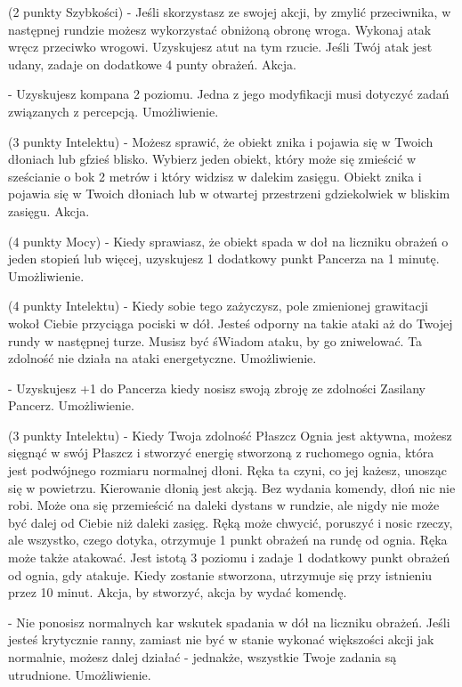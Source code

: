 { (2 punkty Szybkości) - Jeśli skorzystasz ze swojej akcji, by zmylić przeciwnika, w następnej rundzie możesz wykorzystać obniżoną obronę wroga. Wykonaj atak wręcz przeciwko wrogowi. Uzyskujesz atut na tym rzucie. Jeśli Twój atak jest udany, zadaje on dodatkowe 4 punty obrażeń. Akcja.

 - Uzyskujesz kompana 2 poziomu. Jedna z jego modyfikacji musi dotyczyć zadań związanych z percepcją. Umożliwienie.

 (3 punkty Intelektu) - Możesz sprawić, że obiekt znika i pojawia się w Twoich dłoniach lub gfzieś blisko. Wybierz jeden obiekt, który może się zmieścić w sześcianie o bok 2 metrów i który widzisz w dalekim zasięgu. Obiekt znika i pojawia się w Twoich dłoniach lub w otwartej przestrzeni gdziekolwiek w bliskim zasięgu. Akcja.

 (4 punkty Mocy) - Kiedy sprawiasz, że obiekt spada w doł na liczniku obrażeń o jeden stopień lub więcej, uzyskujesz 1 dodatkowy punkt Pancerza na 1 minutę. Umożliwienie.

 (4 punkty Intelektu) - Kiedy sobie tego zażyczysz, pole zmienionej grawitacji wokoł Ciebie przyciąga pociski w dół. Jesteś odporny na takie ataki aż do Twojej rundy w następnej turze. Musisz być śWiadom ataku, by go zniwelować. Ta zdolność nie działa na ataki energetyczne. Umożliwienie.

 - Uzyskujesz +1 do Pancerza kiedy nosisz swoją zbroję ze zdolności Zasilany Pancerz. Umożliwienie.

 (3 punkty Intelektu) - Kiedy Twoja zdolność Płaszcz Ognia jest aktywna, możesz sięgnąć w swój Płaszcz i stworzyć energię stworzoną z ruchomego ognia, która jest podwójnego rozmiaru normalnej dłoni. Ręka ta czyni, co jej każesz, unosząc się w powietrzu. Kierowanie dłonią jest akcją. Bez wydania komendy, dłoń nic nie robi. Może ona się przemieścić na daleki dystans w rundzie, ale nigdy nie może być dalej od Ciebie niż daleki zasięg. Ręką może chwycić, poruszyć i nosic rzeczy, ale wszystko, czego dotyka, otrzymuje 1 punkt obrażeń na rundę od ognia. Ręka może także atakować. Jest istotą 3 poziomu i zadaje 1 dodatkowy punkt obrażeń od ognia, gdy atakuje. Kiedy zostanie stworzona, utrzymuje się przy istnieniu przez 10 minut. Akcja, by stworzyć, akcja by wydać komendę. 

 - Nie ponosisz normalnych kar wskutek spadania w dół na liczniku obrażeń. Jeśli jesteś krytycznie ranny, zamiast nie być w stanie wykonać większości akcji jak normalnie, możesz dalej działać - jednakże, wszystkie Twoje zadania są utrudnione. Umożliwienie. 

}
